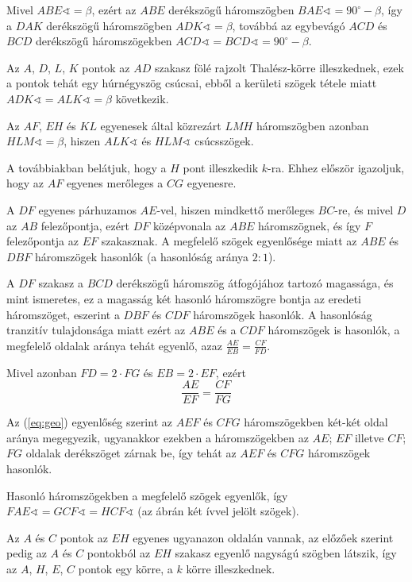 \documentclass[a4paper,10pt]{article}
\begin{document}
Mivel $ABE \sphericalangle = \beta$, ezért az $ABE$ derékszögű háromszögben $BAE \sphericalangle = 90 ^\circ  - \beta$, így a $DAK$
derékszögű háromszögben $ADK \sphericalangle = \beta$, továbbá az egybevágó $ACD$ és $BCD$ derékszögű
háromszögekben $ACD \sphericalangle = BCD \sphericalangle = 90 ^\circ- \beta$.

Az $A$, $D$, $L$, $K$ pontok az $AD$ szakasz fölé rajzolt Thalész-körre illeszkednek, ezek a pontok
tehát egy húrnégyszög csúcsai, ebből a kerületi szögek tétele miatt $ADK \sphericalangle = ALK \sphericalangle = \beta$ 
következik.

Az $AF$, $EH$ és $KL$ egyenesek által közrezárt $LMH$ háromszögben azonban $HLM \sphericalangle = \beta$, hiszen
$ALK \sphericalangle$ és $HLM \sphericalangle$ csúcsszögek.

A továbbiakban belátjuk, hogy a $H$ pont illeszkedik $k$-ra. Ehhez először igazoljuk, hogy az $AF$
egyenes merőleges a $CG$ egyenesre.

A $DF$ egyenes párhuzamos $AE$-vel, hiszen mindkettő merőleges $BC$-re, és mivel $D$ az $AB$
felezőpontja, ezért $DF$ középvonala az $ABE$ háromszögnek, és így $F$ felezőpontja az $EF$
szakasznak. A megfelelő szögek egyenlősége miatt az $ABE$ és $DBF$ háromszögek hasonlók (a
hasonlóság aránya $2:1$).

A $DF$ szakasz a $BCD$ derékszögű háromszög átfogójához tartozó magassága, és mint
ismeretes, ez a magasság két hasonló háromszögre bontja az eredeti háromszöget, eszerint a
$DBF$ és $CDF$ háromszögek hasonlók.
A hasonlóság tranzitív tulajdonsága miatt ezért az $ABE$ és a $CDF$ háromszögek is hasonlók, a
megfelelő oldalak aránya tehát egyenlő, azaz $\frac{AE}{EB}
=\frac{CF}{FD}$.

Mivel azonban $FD = 2 \cdot  FG$ és $EB = 2 \cdot  EF$, ezért
\begin{equation} \label{eq:geo}
\frac{AE}{EF} = \frac{CF}{FG}
\end{equation}

Az (\ref{eq:geo}) egyenlőség szerint az $AEF$ és $CFG$ háromszögekben két-két oldal aránya megegyezik,
ugyanakkor ezekben a háromszögekben az $AE$; $EF$ illetve $CF$; $FG$ oldalak derékszöget zárnak
be, így tehát az $AEF$ és $CFG$ háromszögek hasonlók.

Hasonló háromszögekben a megfelelő szögek egyenlők, így $FAE \sphericalangle = GCF \sphericalangle = HCF \sphericalangle$ (az
ábrán két ívvel jelölt szögek).

Az $A$ és $C$ pontok az $EH$ egyenes ugyanazon oldalán vannak, az előzőek szerint pedig az $A$ és
$C$ pontokból az $EH$ szakasz egyenlő nagyságú szögben látszik, így az $A$, $H$, $E$, $C$ pontok egy
körre, a $k$ körre illeszkednek.
\end{document}
